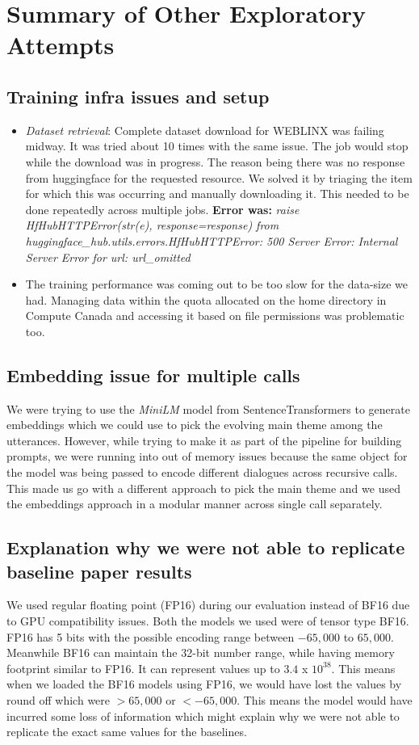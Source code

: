 \documentclass[11pt]{article}
\begin{document}
\section{Summary of Other Exploratory Attempts}
\subsection{Training infra issues and setup}
\begin{itemize}
\item \emph{Dataset retrieval}:
Complete dataset download for WEBLINX was failing midway. It was tried about 10 times with the same issue. The job would stop while the download was in progress. The reason being there was no response from huggingface for the requested resource. We solved it by triaging the item for which this was occurring and manually downloading it. This needed to be done repeatedly across multiple jobs.
	\textbf{Error was: }\emph{raise HfHubHTTPError(str(e), response=response) from huggingface\_hub.utils.errors.HfHubHTTPError: 500 Server Error: Internal Server Error for url:  url\_omitted}

\item  The training performance was coming out to be too slow for the data-size we had. Managing data within the quota allocated on the home directory in Compute Canada and accessing it based on file permissions was problematic too.

\end{itemize}
    
\subsection{Embedding issue for multiple calls}
We were trying to use the \emph{MiniLM} model from SentenceTransformers to generate embeddings which we could use to pick the evolving main theme among the utterances. However, while trying to make it as part of the pipeline for building prompts, we were running into out of memory issues because the same object for the model was being passed to encode different dialogues across recursive calls. This made us go with a different approach to pick the main theme and we used the embeddings approach in a modular manner across single call separately.

\subsection{Explanation why we were not able to replicate baseline paper results} \label{sec:explanation}
We used regular floating point (FP16) during our evaluation instead of BF16 due to GPU compatibility issues. Both the models we used were of tensor type BF16. FP16 has 5 bits with the possible encoding range between $-65,000$ to $65,000$. Meanwhile BF16 can maintain the 32-bit number range, while having memory footprint similar to FP16. It can represent values up to $3.4$ x $10^{38}$. This means when we loaded the BF16 models using FP16, we would have lost the values by round off which were $>65,000$ or $<-65,000$. This means the model would have incurred some loss of information which might explain why we were not able to replicate the exact same values for the baselines.
\end{document}
